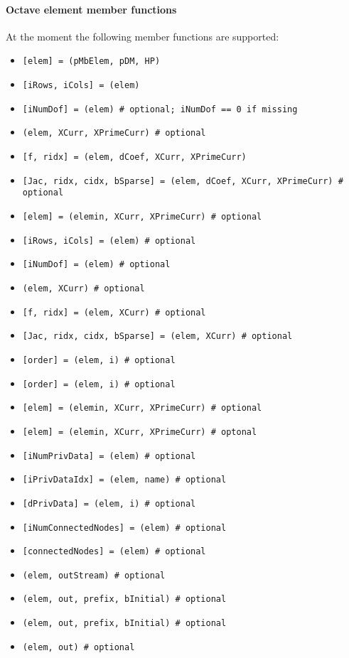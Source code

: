 \paragraph{Octave element member functions}
At the moment the following member functions are supported:
\begin{itemize}
\item \verb![elem] = !\verb!(pMbElem, pDM, HP) !
\item \verb![iRows, iCols] = !\verb!(elem) !
\item \verb![iNumDof] = !\verb!(elem) # optional; iNumDof == 0 if missing !
\item {}\verb!(elem, XCurr, XPrimeCurr) # optional !
\item \verb![f, ridx] = !\verb!(elem, dCoef, XCurr, XPrimeCurr) !
\item \verb![Jac, ridx, cidx, bSparse] = !\verb!(elem, dCoef, XCurr, XPrimeCurr) # optional !
\item \verb![elem] = !\verb!(elemin, XCurr, XPrimeCurr) # optional !
\item \verb![iRows, iCols] = !\verb!(elem) # optional !
\item \verb![iNumDof] = !\verb!(elem) # optional !
\item {}\verb!(elem, XCurr) # optional !
\item \verb![f, ridx] = !\verb!(elem, XCurr) # optional !
\item \verb![Jac, ridx, cidx, bSparse] = !\verb!(elem, XCurr) # optional !
\item \verb![order] = !\verb!(elem, i) # optional !
\item \verb![order] = !\verb!(elem, i) # optional !
\item \verb![elem] = !\verb!(elemin, XCurr, XPrimeCurr) # optional !
\item \verb![elem] = !\verb!(elemin, XCurr, XPrimeCurr) # optonal !
\item \verb![iNumPrivData] = !\verb!(elem) # optional !
\item \verb![iPrivDataIdx] = !\verb!(elem, name) # optional !
\item \verb![dPrivData] = !\verb!(elem, i) # optional !
\item \verb![iNumConnectedNodes] = !\verb!(elem) # optional !
\item \verb![connectedNodes] = !\verb!(elem) # optional !
\item {}\verb!(elem, outStream) # optional !
\item {}\verb!(elem, out, prefix, bInitial) # optional !
\item {}\verb!(elem, out, prefix, bInitial) # optional !
\item {}\verb!(elem, out) # optional !
\end{itemize}
